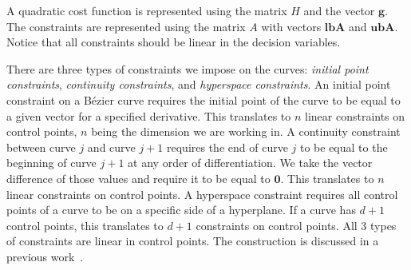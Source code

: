 \documentclass{svproc}
\newcommand{\vg}{\mathbf{g}}
\newcommand{\vzero}{\mathbf{0}}
\newcommand{\vn}{\mathbf{n}}
\newcommand{\vlbA}{\mathbf{lbA}}
\newcommand{\vubA}{\mathbf{ubA}}
\begin{document}
A quadratic cost function is represented using the matrix $H$ and the vector $\vg$. The constraints are represented using the matrix $A$ with vectors $\vlbA$ and $\vubA$.
Notice that all constraints should be linear in the decision variables.

There are three types of constraints we impose on the curves: \emph{initial point constraints}, \emph{continuity constraints}, and \emph{hyperspace constraints}.
An initial point constraint on a B\'ezier curve requires the initial point of the curve to be equal to a given vector for a specified derivative. This translates to $n$ linear constraints on control points, $n$ being the dimension we are working in.
A continuity constraint between curve $j$ and curve $j+1$ requires the end of curve $j$ to be equal to the beginning of curve $j+1$ at any order of differentiation.
We take the vector difference of those values and require it to be equal to $\vzero$. This translates to $n$ linear constraints on control points.
A hyperspace constraint requires all control points of a curve to be on a specific side of a hyperplane. If a curve has $d+1$ control points, this translates to $d+1$ constraints on control points. All 3 types of constraints are linear in control points. The construction is discussed in a previous work~\cite{crazyplanning-ieeetro}.




\end{document}

